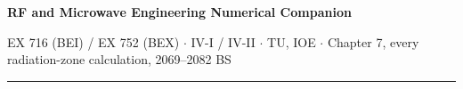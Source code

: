 \documentclass[10pt]{article}
\begin{document}
{\LARGE\bfseries RF and Microwave Engineering \gap\textcolor{sub}{Numerical Companion}}\par
{\footnotesize\color{sub} EX 716 (BEI) / EX 752 (BEX) $\cdot$ IV-I / IV-II $\cdot$ TU, IOE
$\cdot$ Chapter 7, every radiation-zone calculation, 2069--2082 BS}
\vspace{3pt}\hrule\vspace{4pt}

\setcounter{section}{6}



\end{document}

